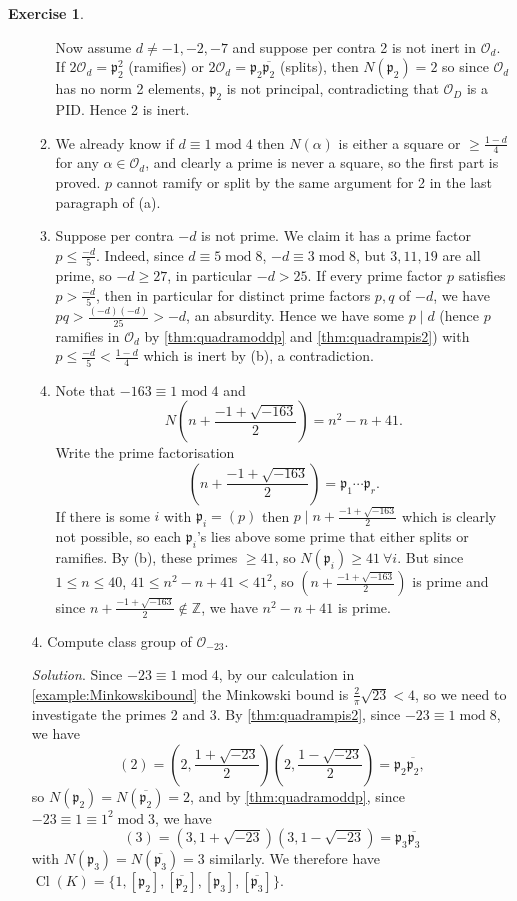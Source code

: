 \documentclass{article}
\newcommand{\Z}{\mathbb{Z}}
\newcommand{\Mod}{\operatorname{mod}}
\newcommand{\Cl}{\operatorname{Cl}}
\newcommand{\ri}{\mathcal{O}}
\newcommand{\ip}{\mathfrak{p}}
\theoremstyle{definition}
\newtheorem{exe}[defn]{Exercise}
\begin{document}
\begin{exe}
\begin{enumerate}
\begin{enumerate}
Now assume $d\neq -1,-2,-7$ and suppose per contra 2 is not inert in $\ri_d$. If $2\ri_d=\ip_2^2$ (ramifies) or $2\ri_d=\ip_2\overline{\ip_2}$ (splits), then $N(\ip_2)=2$ so since $\ri_d$ has no norm 2 elements, $\ip_2$ is not principal, contradicting that $\ri_D$ is a PID. Hence 2 is inert.
\item We already know if $d\equiv 1\Mod 4$ then $N(\alpha)$ is either a square or $\geq\frac{1-d}{4}$ for any $\alpha\in\ri_d$, and clearly a prime is never a square, so the first part is proved. $p$ cannot ramify or split by the same argument for 2 in the last paragraph of (a).
\item Suppose per contra $-d$ is not prime. We claim it has a prime factor $p\leq\frac{-d}{5}$. Indeed, since $d\equiv 5\Mod 8$, $-d\equiv 3\Mod 8$, but $3,11,19$ are all prime, so $-d\geq 27$, in particular $-d>25$. If every prime factor $p$ satisfies $p>\frac{-d}{5}$, then in particular for distinct prime factors $p,q$ of $-d$, we have $pq>\frac{(-d)(-d)}{25}>-d$, an absurdity. Hence we have some $p\mid d$ (hence $p$ ramifies in $\ri_d$ by \ref{thm:quadramoddp} and \ref{thm:quadrampis2}) with $p\leq\frac{-d}{5}<\frac{1-d}{4}$ which is inert by (b), a contradiction.
\item Note that $-163\equiv 1\Mod 4$ and
\[
N\left(n+\frac{-1+\sqrt{-163}}{2}\right)=n^2-n+41.
\]
Write the prime factorisation
\[
\left(n+\frac{-1+\sqrt{-163}}{2}\right)=\ip_1\cdots\ip_r.
\]
If there is some $i$ with $\ip_i=(p)$ then $p\mid n+\frac{-1+\sqrt{-163}}{2}$ which is clearly not possible, so each $\ip_i$'s lies above some prime that either splits or ramifies. By (b), these primes $\geq 41$, so $N(\ip_i)\geq 41 \ \forall i$. But since $1\leq n\leq 40$, $41\leq n^2-n+41<41^2$, so $\left(n+\frac{-1+\sqrt{-163}}{2}\right)$ is prime and since $n+\frac{-1+\sqrt{-163}}{2}\notin\Z$, we have $n^2-n+41$ is prime.
\end{enumerate}

\item[4.] Compute class group of $\ri_{-23}$.

\textit{Solution}. Since $-23\equiv 1\Mod 4$, by our calculation in \ref{example:Minkowskibound} the Minkowski bound is $\frac{2}{\pi}\sqrt{23}<4$, so we need to investigate the primes 2 and 3. By \ref{thm:quadrampis2}, since $-23\equiv 1\Mod 8$, we have
\[
(2)=\left(2,\frac{1+\sqrt{-23}}{2}\right)\left(2,\frac{1-\sqrt{-23}}{2}\right)=\ip_2\overline{\ip_2},
\]
so $N(\ip_2)=N(\overline{\ip_2})=2$, and by \ref{thm:quadramoddp}, since $-23\equiv 1\equiv 1^2\Mod 3$, we have
\[
(3)=\left(3,1+\sqrt{-23}\right)\left(3,1-\sqrt{-23}\right)=\ip_3\overline{\ip_3}
\]
with $N(\ip_3)=N(\overline{\ip_3})=3$ similarly. We therefore have $\Cl(K)=\{1,[\ip_2],[\overline{\ip_2}],[\ip_3],[\overline{\ip_3}]\}$.


\end{enumerate}
\end{exe}
\end{document}
